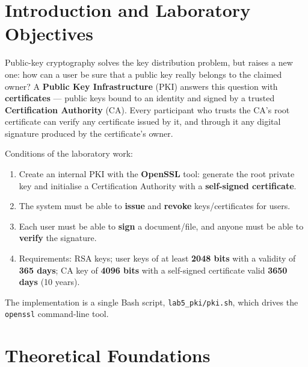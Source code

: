 \documentclass[12pt,a4paper]{article}
\begin{document}
\makereporttitle
\tableofcontents
\newpage

\section{Introduction and Laboratory Objectives}
Public-key cryptography solves the key distribution problem, but raises a new one: how can a
user be sure that a public key really belongs to the claimed owner? A \textbf{Public Key
Infrastructure} (PKI) answers this question with \textbf{certificates} — public keys bound to an
identity and signed by a trusted \textbf{Certification Authority} (CA). Every participant who
trusts the CA's root certificate can verify any certificate issued by it, and through it any
digital signature produced by the certificate's owner.

Conditions of the laboratory work:
\begin{enumerate}
  \item Create an internal PKI with the \textbf{OpenSSL} tool: generate the root private key and
        initialise a Certification Authority with a \textbf{self-signed certificate}.
  \item The system must be able to \textbf{issue} and \textbf{revoke} keys/certificates for users.
  \item Each user must be able to \textbf{sign} a document/file, and anyone must be able to
        \textbf{verify} the signature.
  \item Requirements: RSA keys; user keys of at least \textbf{2048 bits} with a validity of
        \textbf{365 days}; CA key of \textbf{4096 bits} with a self-signed certificate valid
        \textbf{3650 days} (10 years).
\end{enumerate}
The implementation is a single Bash script, \texttt{lab5\_pki/pki.sh}, which drives the
\texttt{openssl} command-line tool.

\section{Theoretical Foundations}
\end{document}
